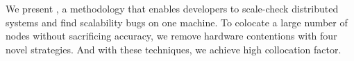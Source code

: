 We present \sck, a methodology that enables developers to scale-check
distributed systems and find scalability bugs on one machine. To colocate a
large number of nodes without sacrificing accuracy, we remove hardware
contentions with four novel strategies. And with these techniques, we achieve
high collocation factor.
